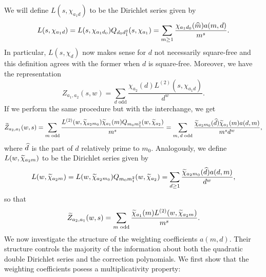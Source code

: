 \documentclass[12pt,reqno,oneside]{amsart}
\begin{document}
    We will define $L(s,\chi_{a_{1}d})$ to be the Dirichlet series given by
    \[
        L(s,\chi_{a_{1}d}) = L(s,\chi_{a_{1}d_{0}})Q_{d_{0}d_{1}^{2}}(s,\chi_{a_{1}}) = \sum_{m \ge 1}\frac{\chi_{a_{1}d_{0}}(\widehat{m})a(m,d)}{m^{s}}.
    \]
    In particular, $L(s,\chi_{d})$ now makes sense for $d$ not necessarily square-free and this definition agrees with the former when $d$ is square-free. Moreover, we have the representation
    \[
        Z_{a_{1},a_{2}}(s,w) = \sum_{\text{$d$ odd}}\frac{\chi_{a_{2}}(d)L^{(2)}(s,\chi_{a_{1}d})}{d^{w}}.
    \]
    If we perform the same procedure but with the interchange, we get
    \[
        \widetilde{Z}_{a_{2},a_{1}}(w,s) = \sum_{\text{$m$ odd}}\frac{L^{(2)}(w,\widetilde{\chi}_{a_{2}m_{0}})\widetilde{\chi}_{a_{1}}(m)Q_{m_{0}m_{1}^{2}}(w,\widetilde{\chi}_{a_{2}})}{m^{s}} = \sum_{\text{$m,d$ odd}}\frac{\widetilde{\chi}_{a_{2}m_{0}}(\widehat{d})\widetilde{\chi}_{a_{1}}(m)a(d,m)}{m^{s}d^{w}},
    \]
    where $\widehat{d}$ is the part of $d$ relatively prime to $m_{0}$. Analogously, we define $L(w,\widetilde{\chi}_{a_{2}m})$ to be the Dirichlet series given by
    \[
        L(w,\widetilde{\chi}_{a_{2}m}) = L(w,\widetilde{\chi}_{a_{2}m_{0}})Q_{m_{0}m_{1}^{2}}(w,\widetilde{\chi}_{a_{2}}) = \sum_{d \ge 1}\frac{\widetilde{\chi}_{a_{2}m_{0}}(\widehat{d})a(d,m)}{d^{w}},
    \]
    so that
    \[
        \widetilde{Z}_{a_{2},a_{1}}(w,s) = \sum_{\text{$m$ odd}}\frac{\widetilde{\chi}_{a_{1}}(m)L^{(2)}(w,\widetilde{\chi}_{a_{2}m})}{m^{s}}.
    \]
    We now investigate the structure of the weighting coefficients $a(m,d)$. Their structure controls the majority of the information about both the quadratic double Dirichlet series and the correction polynomials. We first show that the weighting coefficients posess a multiplicativity property:
\end{document}
